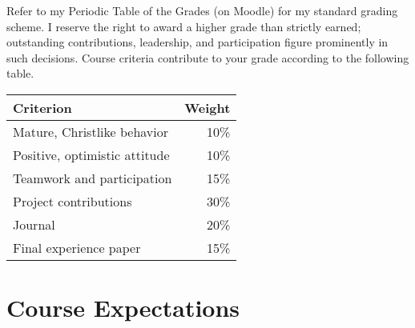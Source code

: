 \documentclass[11pt]{article}
\begin{document}
Refer to my Periodic Table of the Grades (on Moodle)
for my standard grading scheme.
I reserve the right to award a higher grade
than strictly earned; outstanding contributions,
leadership, and participation figure prominently in such decisions.
Course criteria contribute to your grade according to the following table.
\begin{center}
\begin{tabular}{lr}
Criterion                     & Weight \\
\hline
Mature, Christlike behavior   & 10\%   \\
Positive, optimistic attitude & 10\%   \\
Teamwork and participation    & 15\%   \\
Project contributions         & 30\%   \\
Journal                       & 20\%   \\
Final experience paper        & 15\%   \\
\end{tabular}
\end{center}

\section{Course Expectations}


\printbibliography{}
\end{document}
